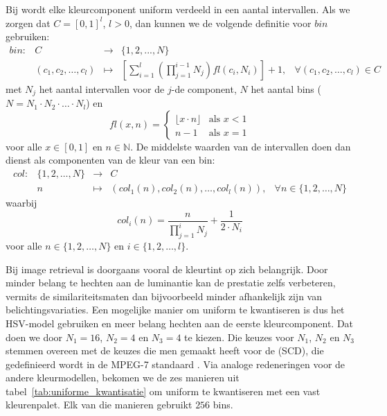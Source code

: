 Bij  wordt elke kleurcomponent uniform verdeeld in een 
aantal intervallen. Als we zorgen dat $C=[0,1]^l$, $l > 0$, dan kunnen we de 
volgende definitie voor $bin$ gebruiken:
\begin{displaymath}
\begin{array}{lrcll}
bin: & C & \to & \{1,2,...,N\}\\[5pt] & (c_1,c_2,\ldots,c_l) & \mapsto & \left[ 
\displaystyle\sum_{i=1}^l \left( \prod_{j=1}^{i-1} N_j \right) \mathit{fl}(c_i, N_i) \right] 
+ 1, & \forall (c_1,c_2,\ldots,c_l) \in C
\end{array}
\end{displaymath}
met $N_j$ het aantal intervallen voor de $j$-de component, $N$ het aantal 
bins ($N=N_1 \cdot N_2 \cdot \ldots \cdot N_l$) en 
\begin{displaymath}
\mathit{fl}(x,n) = \begin{cases}
\lfloor x \cdot n \rfloor & \textrm{als } x < 1 \\ 
n - 1 & \textrm{als } x = 1
\end{cases}
\end{displaymath}
voor alle $x \in [0,1]$ en $n \in \mathbb{N}$. De middelste waarden van de 
intervallen doen dan dienst als componenten van de kleur van een bin:
\begin{displaymath}
\begin{array}{lrcll}
col: & \{1,2,\ldots,N\} & \to & C \\ & n & \mapsto & (col_1(n), col_2(n), 
\dots, col_l(n)), & \forall n \in \{1,2,\ldots,N\}
\end{array}
\end{displaymath}
waarbij 
\begin{displaymath}
col_i(n) = \frac{n}{\prod_{j=1}^i N_j} + \frac{1}{2 \cdot N_i}
\end{displaymath} 
voor alle $n \in \{1,2,\ldots,N\}$ en $i \in \{1,2,\ldots,l\}$.

Bij image retrieval is doorgaans vooral de kleurtint op zich belangrijk. Door
minder belang te hechten aan de luminantie kan de prestatie zelfs verbeteren,
vermits de similariteitsmaten dan bijvoorbeeld minder afhankelijk zijn van
belichtingsvariaties. 
Een mogelijke manier om uniform te kwantiseren is dus
het HSV-model gebruiken en meer belang hechten aan de eerste kleurcomponent. 
Dat doen we door $N_1=16$, $N_2=4$ en $N_3=4$ te kiezen.
Die keuzes voor $N_1$, $N_2$ en $N_3$ stemmen overeen met de keuzes die men 
gemaakt heeft voor de  (SCD), die gedefinieerd 
wordt in de MPEG-7 standaard \cite{manjunath:color_and_texture_descriptors}.
Via analoge redeneringen voor de andere kleurmodellen, bekomen we de zes manieren 
uit tabel~\ref{tab:uniforme_kwantisatie} om uniform te kwantiseren met een vast kleurenpalet.
Elk van die manieren gebruikt $256$ bins.


